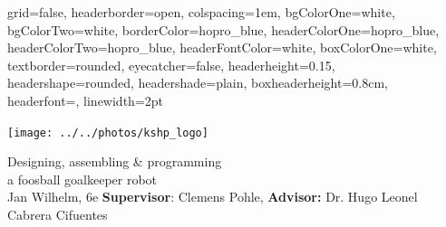 \documentclass[paperheight=128cm,paperwidth=89.5cm,portrait]{./baposter}
\begin{document}

    \begin{poster}
    {
        grid=false,
        headerborder=open, %
        colspacing=1em, %
        bgColorOne=white, %
        bgColorTwo=white, %
        borderColor=hopro_blue, %
        headerColorOne=hopro_blue, %
        headerColorTwo=hopro_blue, %
        headerFontColor=white, %
        boxColorOne=white, %
        textborder=rounded, %
        eyecatcher=false, %
        headerheight=0.15\textheight, %
        headershape=rounded, %
        headershade=plain,
        boxheaderheight=0.8cm,
        headerfont=\huge\textsf, %
        linewidth=2pt %
    }
    {}
%
%
    {

        \noindent
        \begin{minipage}{.1\linewidth}
            \texttt{[image: ../../photos/kshp\_logo]}
        \end{minipage}%
        \begin{minipage}{.05\linewidth}
        \end{minipage}
        \begin{minipage}{.9\linewidth}
            \centering
            \textsf{
                \fontsize{30}{8}\selectfont
                Designing, assembling \& programming \\a foosball goalkeeper robot
            }\\
            \sf\vspace{0.5em}
            \fontsize{18}{8}\selectfont
            Jan Wilhelm, 6e \hspace{0.3cm} \textbf{Supervisor}: Clemens Pohle, \textbf{Advisor:} Dr. Hugo Leonel Cabrera Cifuentes
        \end{minipage}
        \vspace{1cm}

}
\end{poster}
\end{document}
